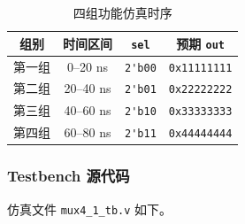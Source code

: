 \begin{table}[H]
    \centering
    \caption{四组功能仿真时序}
    \label{tab:mux4_groups}
    \begin{tabular}{c|c|c|c}
        \hline
        组别 & 时间区间 & \verb|sel| & 预期 \verb|out| \\
        \hline
        第一组 & 0--20 ns & \verb|2'b00| & \verb|0x11111111| \\
        第二组 & 20--40 ns & \verb|2'b01| & \verb|0x22222222| \\
        第三组 & 40--60 ns & \verb|2'b10| & \verb|0x33333333| \\
        第四组 & 60--80 ns & \verb|2'b11| & \verb|0x44444444| \\
        \hline
    \end{tabular}
\end{table}

\subsubsection{Testbench 源代码}

仿真文件 \verb|mux4_1_tb.v| 如下。

